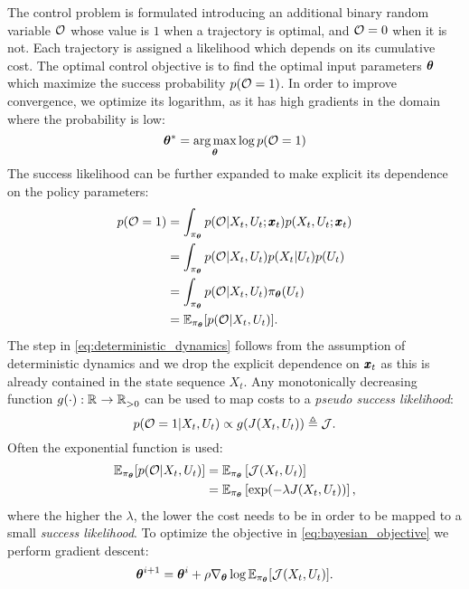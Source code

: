 The control problem is formulated introducing an additional binary random variable $\mathcal{O}$ whose value is $1$ when a trajectory is optimal, and $\mathcal{O} = 0$ when it is not. Each trajectory is assigned a likelihood which depends on its cumulative cost. The optimal control objective is to find the optimal input parameters $\boldsymbol{\theta}$ which maximize the success probability $p(\mathcal{O} = 1)$. In order to improve convergence, we optimize its logarithm, as it has high gradients in the domain where the probability is low: 
\begin{equation} \label{eq:bayesian_objective}
    \boldsymbol{\theta}^* = \underset{\boldsymbol{\theta}}{\arg\max} \log p(\mathcal{O} = 1)
\end{equation}
The success likelihood can be further expanded to make explicit its dependence on the policy parameters:
\begin{align}
        p(\mathcal{O} = 1)
        &= \int_{\pi_{\boldsymbol{\theta}}} p(\mathcal{O} | X_t, U_t; \pmb{x}_t) p(X_t, U_t; \pmb{x}_t) \\
        &= \int_{\pi_{\boldsymbol{\theta}}}p(\mathcal{O} | X_t, U_t) p(X_t| U_t) p(U_t) \label{eq:deterministic_dynamics}\\
        &= \int_{\pi_{\boldsymbol{\theta}}}p(\mathcal{O} | X_t, U_t) \pi_{\boldsymbol{\theta}}(U_t) \\
        &= \mathbb{E}_{\pi_{\boldsymbol{\theta}}} [p(\mathcal{O} | X_t, U_t)].
        \label{eq:input_to_params}
\end{align}
The step in \eqref{eq:deterministic_dynamics} follows from the assumption of deterministic dynamics and we drop the explicit dependence on $\pmb{x}_t$ as this is already contained in the state sequence $X_t$. Any monotonically decreasing function $g(\cdot): \mathbb{R}^{} \rightarrow \mathbb{R}^{}_{>0}$ can be used to map costs to a \textit{pseudo success likelihood}:
\begin{equation}
p(\mathcal{O} = 1| X_t, U_t) \propto g(J(X_t, U_t)) \triangleq \mathcal{J}.
\end{equation}
Often the exponential function is used:
\begin{align*}
    \mathbb{E}_{\pi_{\boldsymbol{\theta}}} [p(\mathcal{O} | X_t, U_t)]  
    &= \mathbb{E}_{\pi_{\boldsymbol{\theta}}} \left[ \mathcal{J}(X_t, U_t) \right] \\
    &= \mathbb{E}_{\pi_{\boldsymbol{\theta}}} \left[ \exp (-\lambda J(X_t, U_t)) \right],
\end{align*}
where the higher the $\lambda$, the lower the cost needs to be in order to be mapped to a small \textit{success likelihood}. To optimize the objective in \eqref{eq:bayesian_objective} we perform gradient descent:
\begin{equation}
    \boldsymbol{\theta}^{i+1} 
    = \boldsymbol{\theta}^i + \rho \nabla_{ \boldsymbol{\theta}}\log \mathbb{E}_{\pi_{\boldsymbol{\theta}}} [\mathcal{J}(X_t, U_t)].
\end{equation}


